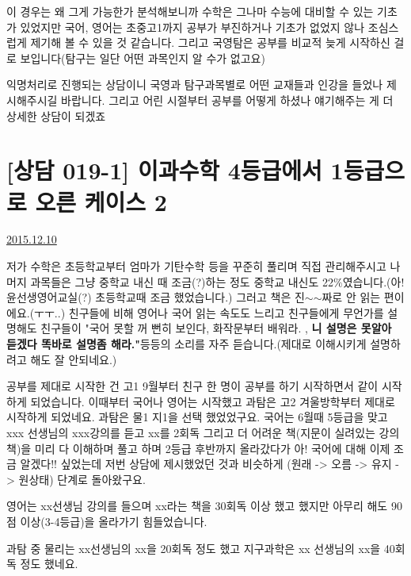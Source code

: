 이 경우는 왜 그게 가능한가 분석해보니까
수학은 그나마 수능에 대비할 수 있는 기초가 있었지만
국어, 영어는 초중고1까지 공부가 부진하거나 기초가 없었지 않나 조심스럽게 제기해 볼 수 있을 것 같습니다.
그리고 국영탐은 공부를 비교적 늦게 시작하신 걸로 보입니다(탐구는 일단 어떤 과목인지 알 수가 없고요)
\vspace{5mm}

익명처리로 진행되는 상담이니
국영과 탐구과목별로 어떤 교재들과 인강을 들었나 제시해주시길 바랍니다.
그리고 어린 시절부터 공부를 어떻게 하셨나 얘기해주는 게 더 상세한 상담이 되겠죠



\section{[상담 019-1] 이과수학 4등급에서 1등급으로 오른 케이스 2}
\href{https://www.kockoc.com/Apoc/538099}{2015.12.10}

\vspace{5mm}

저가 수학은 초등학교부터 엄마가 기탄수학 등을 꾸준히 풀리며 직접 관리해주시고 나머지 과목들은 그냥 중학교 내신 때 조금(?)하는 정도 중학교 내신도 22$\%$였습니다.(아! 윤선생영어교실(?) 초등학교때 조금 했었습니다.)
그러고 책은 진$\sim$$\sim$짜로 안 읽는 편이에요.(ㅜㅜ..) 친구들에 비해 영어나 국어 읽는 속도도 느리고 친구들에게 무언가를 설명해도 친구들이 "국어 못할 꺼 뻔히 보인다, 화작문부터 배워라. , \textbf{니 설명은 못알아 듣겠다 똑바로 설명좀 해라."}등등의 소리를 자주 듣습니다.(제대로 이해시키게 설명하려고 해도 잘 안되네요.)
\vspace{5mm}

공부를 제대로 시작한 건 고1 9월부터 친구 한 명이 공부를 하기 시작하면서 같이 시작하게 되었습니다.
이때부터 국어나 영어는 시작했고 과탐은 고2 겨울방학부터 제대로 시작하게 되었네요. 과탐은 물1 지1을 선택 했었었구요.
국어는 6월때 5등급을 맞고 xxx 선생님의 xxx강의를 듣고 xx를 2회독 그리고 더 어려운 책(지문이 실려있는 강의책)을 미리 다 이해하며 풀고 하며 2등급 후반까지 올라갔다가 아! 국어에 대해 이제 조금 알겠다!! 싶었는데 저번 상담에 제시했었던 것과 비슷하게 (원래 -> 오름 -> 유지 -> 원상태) 단계로 돌아왔구요.
\vspace{5mm}

영어는 xx선생님 강의를 들으며 xx라는 책을 30회독 이상 했고 했지만 아무리 해도 90점 이상(3-4등급)을 올라가기 힘들었습니다.
\vspace{5mm}

과탐 중 물리는 xx선생님의 xx을 20회독 정도 했고 지구과학은 xx 선생님의 xx을  40회독 정도 했네요.
\vspace{5mm}

